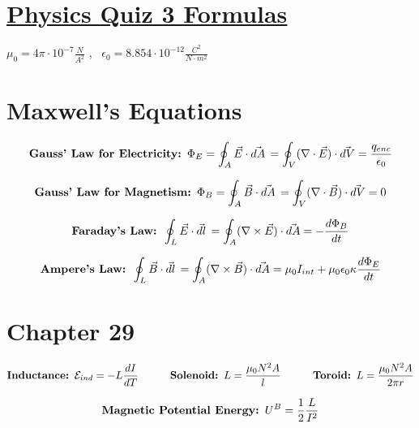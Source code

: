 \documentclass[fleqn]{article}
\begin{document}
\section*{\LARGE\underline{Physics Quiz 3 Formulas}}
$ \mu_0 = 4\pi \cdot 10^{-7} \frac{N}{A^2}$ , \, 
$\epsilon_0 = 8.854 \cdot 10^{-12} \frac{C^2}{N \cdot m^2}$
\section*{Maxwell's Equations}
\begin{equation} \label{eq1}
 \mbox{\textbf{Gauss' Law for Electricity: }}\Phi_{E} = 
    \oint_A \vec{E} \cdot \vec{dA} \, = \oint_V ( \nabla \cdot \vec{E}) \cdot \vec{dV}
= \frac{q_{enc}}{\epsilon_0}
\end{equation}

\begin{equation} \label{eq1}
 \mbox{\textbf{Gauss' Law for Magnetism: }}\Phi_{B} = 
    \oint_A \vec{B} \cdot \vec{dA} \, = \oint_V ( \nabla \cdot \vec{B}) \cdot \vec{dV}
= 0
\end{equation}

\begin{equation} \label{eq1}
 \mbox{\textbf{Faraday's Law: }}
    \oint_L \vec{E} \cdot \vec{dl} \, = \oint_A ( \nabla \times \vec{E}) \cdot \vec{dA}
= - \frac{d\Phi_{B}}{dt}
\end{equation}

\begin{equation} \label{eq1}
 \mbox{\textbf{Ampere's Law: }}
    \oint_L \vec{B} \cdot \vec{dl} \, = \oint_A ( \nabla \times \vec{B}) \cdot \vec{dA}
= \mu_{0}I_{int} + \mu_{0}\epsilon_{0}\kappa\frac{d\Phi_{E}}{dt}
\end{equation}

\section*{Chapter 29}

\begin{equation} \label{eq1}
 \mbox{\textbf{Inductance: }}\mathcal{E}_{ind} = -L \frac{dI}{dT}
 \quad \quad \quad \mbox{\textbf{Solenoid: }}L = \frac{\mu_0 N^2 A}{l}
 \quad \quad \quad \mbox{\textbf{Toroid: }}L = \frac{\mu_0 N^2 A}{2\pi r}
\end{equation}

\begin{equation}
    \label{eq2}
   \mbox{\textbf{Magnetic Potential Energy: }} U^B = \frac{1}{2}\frac{L}{I^2}
\end{equation}
\end{document}
